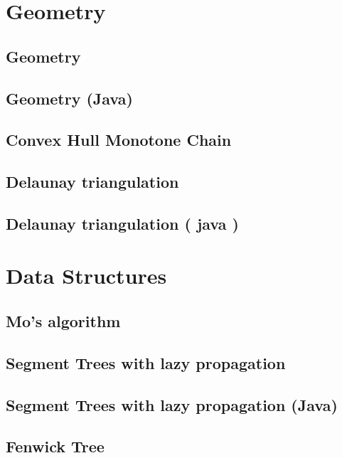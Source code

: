 \section{Geometry}
\subsection{Geometry}
\raggedbottom
\hrulefill
\subsection{Geometry (Java)}
\raggedbottom
\hrulefill
\subsection{Convex Hull Monotone Chain}
\raggedbottom
\hrulefill
\subsection{Delaunay triangulation}
\raggedbottom
\hrulefill
\subsection{Delaunay triangulation ( java )}
\raggedbottom
\hrulefill

\section{Data Structures}
\subsection{Mo's algorithm}
\raggedbottom
\hrulefill
\subsection{Segment Trees with lazy propagation}
\raggedbottom
\hrulefill
\subsection{Segment Trees with lazy propagation (Java)}
\raggedbottom
\hrulefill
\subsection{Fenwick Tree}
\raggedbottom
\hrulefill
